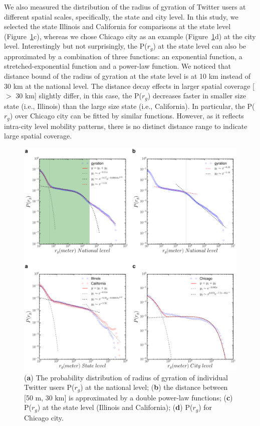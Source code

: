 \documentclass[ijgi,article,accept,moreauthors,pdftex,10pt,a4paper]{mdpi}
\theoremstyle{mdpi}
\newcounter{ex}
\newcounter{re}
\theoremstyle{mdpidefinition}
\begin{document}
We also measured the distribution of the radius of gyration of Twitter users at different spatial scales, specifically, the state and city level.
In this study, we selected the state Illinois and California for comparisons at the state level (Figure~\ref{fig:gyration}c), whereas we chose Chicago city as an example (Figure~\ref{fig:gyration}d) at the city level.
Interestingly but not surprisingly, the P($r_{g}$) at the state level can also be approximated by a combination of three functions: an exponential function, a stretched-exponential function and a power-law function.
We noticed that distance bound of the radius of gyration at the state level is at 10 km instead of 30 km at the national level.
The distance decay effects in larger spatial coverage [$>$ 30 km] slightly differ, in this case, the P($r_{g}$) decreases faster in smaller size state (i.e., Illinois) than the large size state (i.e., California).
In particular, the P($r_{g}$) over Chicago city can be fitted by similar functions.
However, as it reflects intra-city level mobility patterns, there is no distinct distance range to indicate large spatial coverage.

\begin{figure}[ht]
\centering
\includegraphics[width=1.0\linewidth]{./figures/gyration2}
\caption{ ({\bf a}) The probability distribution of radius of gyration of individual Twitter users P($r_{g}$) at the national level; ({\bf b}) the distance between [50 m, 30 km] is approximated by a double power-law functions; ({\bf c}) P($r_{g}$) at the state level (Illinois and California); ({\bf d}) P($r_{g}$) for Chicago city.} 
\label{fig:gyration}
\end{figure}
\FloatBarrier
\end{document}
